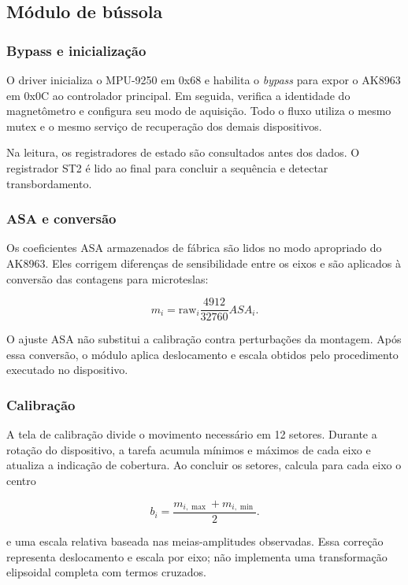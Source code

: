 \documentclass[a4paper,12pt]{article}
\begin{document}
\subsection{M\'odulo de b\'ussola}


\subsubsection{Bypass e inicializa\c{c}\~ao}


O driver inicializa o MPU-9250 em 0x68 e habilita o \emph{bypass} para expor o AK8963 em 0x0C ao controlador principal. Em seguida, verifica a identidade do magnet\^ometro e configura seu modo de aquisi\c{c}\~ao. Todo o fluxo utiliza o mesmo mutex e o mesmo servi\c{c}o de recupera\c{c}\~ao dos demais dispositivos.


Na leitura, os registradores de estado s\~ao consultados antes dos dados. O registrador ST2 \'e lido ao final para concluir a sequ\^encia e detectar transbordamento.


\subsubsection{ASA e convers\~ao}


Os coeficientes ASA armazenados de f\'abrica s\~ao lidos no modo apropriado do AK8963. Eles corrigem diferen\c{c}as de sensibilidade entre os eixos e s\~ao aplicados \`a convers\~ao das contagens para microteslas:


\[
m_i=\mathrm{raw}_i\frac{4912}{32760}ASA_i.
\]


O ajuste ASA n\~ao substitui a calibra\c{c}\~ao contra perturba\c{c}\~oes da montagem. Ap\'os essa convers\~ao, o m\'odulo aplica deslocamento e escala obtidos pelo procedimento executado no dispositivo.


\subsubsection{Calibra\c{c}\~ao}


A tela de calibra\c{c}\~ao divide o movimento necess\'ario em 12 setores. Durante a rota\c{c}\~ao do dispositivo, a tarefa acumula m\'inimos e m\'aximos de cada eixo e atualiza a indica\c{c}\~ao de cobertura. Ao concluir os setores, calcula para cada eixo o centro


\[
b_i=\frac{m_{i,\max}+m_{i,\min}}{2}.
\]


e uma escala relativa baseada nas meias-amplitudes observadas. Essa corre\c{c}\~ao representa deslocamento e escala por eixo; n\~ao implementa uma transforma\c{c}\~ao elipsoidal completa com termos cruzados.
\end{document}
